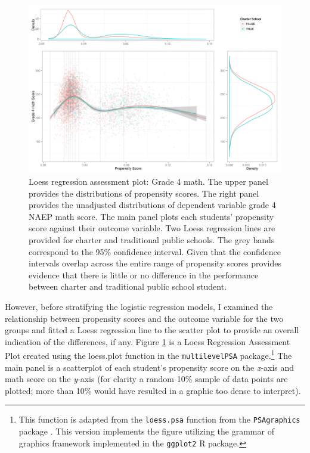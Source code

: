\documentclass[letterpaper,12pt]{article} %
\begin{document}
\setlength{\belowcaptionskip}{-10pt}
\begin{figure}[t]
\begin{center}
\includegraphics[width=\textwidth]{../Figures2009/g4math-loess.pdf}
\caption[Loess regression assessment plot: Grade 4 math]{Loess regression assessment plot: Grade 4 math. The upper panel provides the distributions of propensity scores. The right panel provides the unadjusted distributions of dependent variable grade 4 NAEP math score. The main panel plots each students' propensity score against their outcome variable. Two Loess regression lines are provided for charter and traditional public schools. The grey bands correspond to the 95\% confidence interval. Given that the confidence intervals overlap across the entire range of propensity scores provides evidence that there is little or no difference in the performance between charter and traditional public school student.}
\label{fig:g4math:loess}
\end{center}
\end{figure}
\setlength{\belowcaptionskip}{0pt}

However, before stratifying the logistic regression models, I examined the relationship between propensity scores and the outcome variable for the two groups and fitted a Loess regression line to the scatter plot to provide an overall indication of the differences, if any. Figure \ref{fig:g4math:loess} is a Loess Regression Assessment Plot created using the loess.plot function in the \texttt{multilevelPSA} package.\footnote{This function is adapted from the \texttt{loess.psa} function from the \texttt{PSAgraphics} package \cite{HelmreichPruzek2009}. This version implements the figure utilizing the grammar of graphics framework \cite{Wilkinson2005} implemented in the  \texttt{ggplot2} \cite{Wickham2009} R package.} The main panel is a scatterplot of each student's propensity score on the \textit{x}-axis and math score on the \textit{y}-axis (for clarity a random 10\% sample of data points are plotted; more than 10\% would have resulted in a graphic too dense to interpret). 
\end{document}
